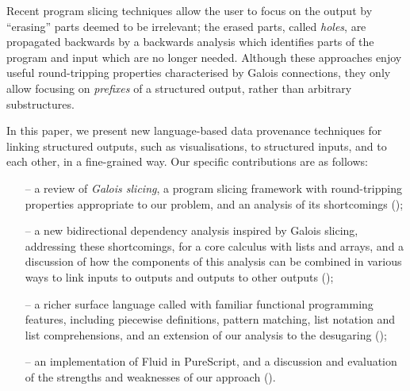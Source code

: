Recent program slicing techniques \cite{perera12a,perera13a,ricciotti17} allow the user to focus on the output by ``erasing'' parts deemed to be irrelevant; the erased parts, called \emph{holes}, are propagated backwards by a backwards analysis which identifies parts of the program and input which are no longer needed. Although these approaches enjoy useful round-tripping properties characterised by Galois connections, they only allow focusing on \emph{prefixes} of a structured output, rather than arbitrary substructures.

In this paper, we present new language-based data provenance techniques for linking structured outputs, such as visualisations, to structured inputs, and to each other, in a fine-grained way. Our specific contributions are as follows:

\begin{itemize}[leftmargin=*]
   \item[--] a review of \emph{Galois slicing}, a program slicing framework with round-tripping properties appropriate to our problem, and an analysis of its shortcomings ();
   \item[--] a new bidirectional dependency analysis inspired by Galois slicing, addressing these shortcomings, for a core calculus with lists and arrays, and a discussion of how the components of this analysis can be combined in various ways to link inputs to outputs and outputs to other outputs ();
   \item[--] a richer surface language called \OurLanguage with familiar functional programming features, including piecewise definitions, pattern matching, list notation and list comprehensions, and an extension of our analysis to the desugaring ();
   \item[--] an implementation of Fluid in PureScript, and a discussion and evaluation of the strengths and weaknesses of our approach ().
\end{itemize}
